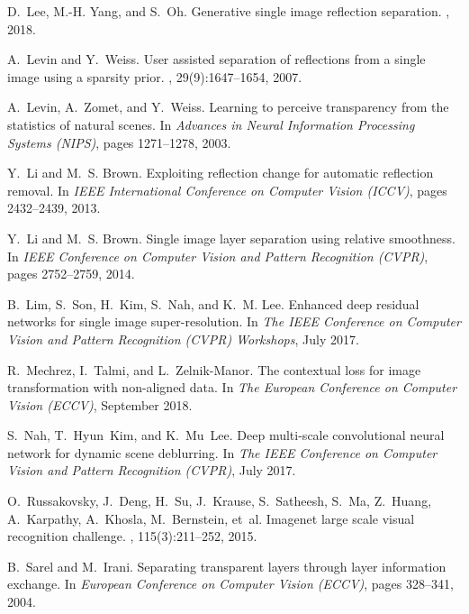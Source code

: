 \documentclass[10pt,twocolumn,letterpaper]{article}
\begin{document}
{\begin{thebibliography}{10}
D.~Lee, M.-H. Yang, and S.~Oh.
\newblock Generative single image reflection separation.
, 2018.

A.~Levin and Y.~Weiss.
\newblock User assisted separation of reflections from a single image using a
  sparsity prior.
, 29(9):1647--1654, 2007.

A.~Levin, A.~Zomet, and Y.~Weiss.
\newblock Learning to perceive transparency from the statistics of natural
  scenes.
\newblock In {\em Advances in Neural Information Processing Systems (NIPS)},
  pages 1271--1278, 2003.

Y.~Li and M.~S. Brown.
\newblock Exploiting reflection change for automatic reflection removal.
\newblock In {\em IEEE International Conference on Computer Vision (ICCV)},
  pages 2432--2439, 2013.

Y.~Li and M.~S. Brown.
\newblock Single image layer separation using relative smoothness.
\newblock In {\em IEEE Conference on Computer Vision and Pattern Recognition
  (CVPR)}, pages 2752--2759, 2014.

B.~Lim, S.~Son, H.~Kim, S.~Nah, and K.~M. Lee.
\newblock Enhanced deep residual networks for single image super-resolution.
\newblock In {\em The IEEE Conference on Computer Vision and Pattern
  Recognition (CVPR) Workshops}, July 2017.

R.~Mechrez, I.~Talmi, and L.~Zelnik-Manor.
\newblock The contextual loss for image transformation with non-aligned data.
\newblock In {\em The European Conference on Computer Vision (ECCV)}, September
  2018.

S.~Nah, T.~Hyun~Kim, and K.~Mu~Lee.
\newblock Deep multi-scale convolutional neural network for dynamic scene
  deblurring.
\newblock In {\em The IEEE Conference on Computer Vision and Pattern
  Recognition (CVPR)}, July 2017.

O.~Russakovsky, J.~Deng, H.~Su, J.~Krause, S.~Satheesh, S.~Ma, Z.~Huang,
  A.~Karpathy, A.~Khosla, M.~Bernstein, et~al.
\newblock Imagenet large scale visual recognition challenge.
,
  115(3):211--252, 2015.

B.~Sarel and M.~Irani.
\newblock Separating transparent layers through layer information exchange.
\newblock In {\em European Conference on Computer Vision (ECCV)}, pages
  328--341, 2004.


\end{thebibliography}}
\end{document}

